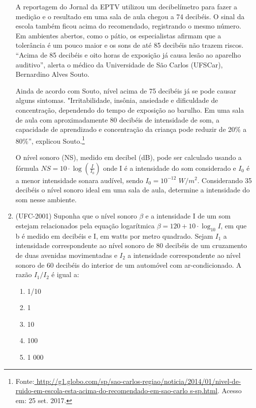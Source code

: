\begin{enumerate}
A reportagem do Jornal da EPTV utilizou um decibelímetro para fazer a medição e o resultado em uma sala de aula chegou a 74 decibéis. O sinal da escola também ficou acima do recomendado, registrando o mesmo número. Em ambientes abertos, como o pátio, os especialistas afirmam que a tolerância é um pouco maior e os sons de até 85 decibéis não trazem riscos. “Acima de 85 decibéis e oito horas de exposição já causa lesão ao aparelho auditivo”, alerta 
o médico da Universidade de São Carlos (UFSCar), Bernardino Alves Souto.

Ainda de acordo com Souto, nível acima de 75 decibéis já se pode causar alguns sintomas. "Irritabilidade, 
insônia, 
ansiedade e dificuldade de concentração, dependendo do tempo de exposição ao barulho. Em uma sala de aula com 
aproximadamente 80 decibéis de intensidade de som, a capacidade de aprendizado e concentração da criança pode reduzir de 
20{\%} a 80{\%}”, explicou 
Souto.\footnote{Fonte:\url{
http://g1.globo.com/sp/sao-carlos-regiao/noticia/2014/01/nivel-de-ruido-em-escola-esta-acima-do-recomendado-em-sao-carlo
s-sp.html}. Acesso em: 25 set. 2017.}

 O nível sonoro (NS), medido em decibel (dB), pode ser calculado usando a fórmula $NS=10\cdot \log(\frac{I}{I_0})$ onde I 
é a intensidade do som considerado e $I_0$ é a menor intensidade sonara audível, sendo  $I_0=10^{-12}$ $W/m^2$. 
Considerando 35 decibéis o nível sonoro ideal em uma sala de aula, determine a intensidade do som nesse ambiente.


\item {}\label{UFC2001}

(UFC-2001) Suponha que o nível sonoro $\beta$ e a intensidade I de um som estejam relacionados pela equação logarítmica 
$\beta = 120 + 10\cdot \log_{10} I$, em que b é medido em decibéis e I, em watts por metro quadrado. Sejam $I_1$ a 
intensidade correspondente ao nível sonoro de 80 decibéis de um cruzamento de duas avenidas movimentadas e $I_2$ a 
intensidade correspondente ao nível sonoro de 60 decibéis do interior de um automóvel com ar-condicionado. A razão 
$I_1/I_2$ é igual a:
 \begin{enumerate}

     \item 1/10
     \item 1
     \item 10 
     \item 100
     \item 1 000
 \end{enumerate}



\end{enumerate}
